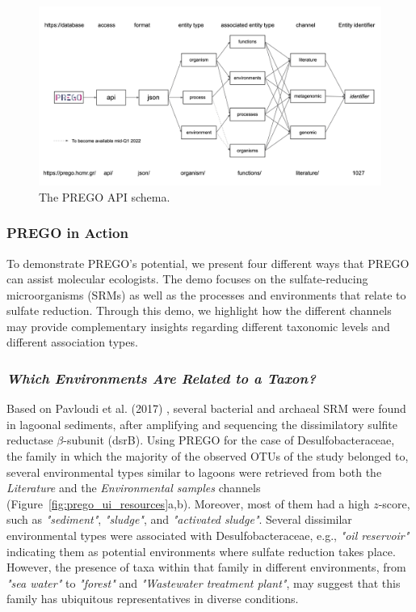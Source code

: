    \begin{figure}[h]
      \centering
      \includegraphics[width=135mm]{figures/figure_4_PREGO API.png}
      \caption[The PREGO API schema]{The PREGO API schema.}
      \label{fig:prego_api_schema}
   \end{figure}


   \subsubsection*{PREGO in Action}
   \label{subsec:prego-action}

   To demonstrate PREGO's potential, we present four different ways that PREGO can assist molecular ecologists. 
   The demo focuses on the sulfate-reducing microorganisms (SRMs) as well as the processes and environments that relate to sulfate reduction. 
   Through this demo, we highlight how the different channels may provide complementary insights regarding different taxonomic levels and different association types.

   \subsubsection*{\textit{Which Environments Are Related to a Taxon?}}
   \label{subsec:envo-taxa}

   Based on Pavloudi et al. (2017) \citep{pavloudi2017diversity}, several bacterial and archaeal SRM were found in lagoonal sediments, after amplifying and sequencing the dissimilatory sulfite reductase $\beta$-subunit (dsrB). 
   Using PREGO for the case of Desulfobacteraceae, the family in which the majority of the observed OTUs of the study belonged to, several environmental types similar to lagoons were retrieved from both the \textit{Literature} and the \textit{Environmental samples} channels (Figure~\ref{fig:prego_ui_resources}a,b). Moreover, most of them had a high $z$-score, such as \textit{"sediment"}, \textit{"sludge"}, and \textit{"activated sludge"}. 
   Several dissimilar environmental types were associated with Desulfobacteraceae, e.g., \textit{"oil reservoir"} indicating them as potential environments where sulfate reduction takes place. 
   However, the presence of taxa within that family in different environments, from \textit{"sea water"} to \textit{"forest"} and \textit{"Wastewater treatment plant"}, may suggest that this family has ubiquitous representatives in diverse conditions.

